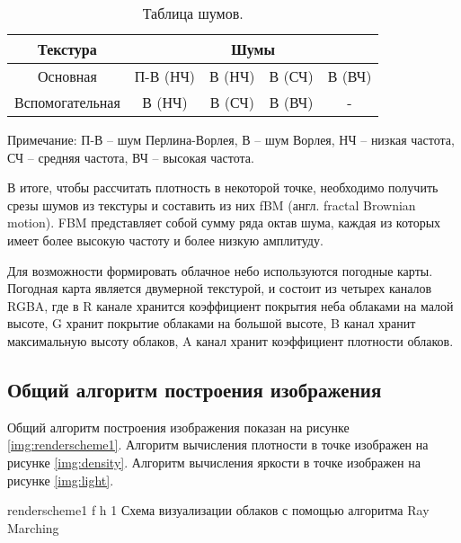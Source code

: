 \begin{table}[h]
	\centering
	\begin{threeparttable}
		\captionsetup{justification=raggedleft,singlelinecheck=false}
		\caption{Таблица шумов.}      
		\begin{tabular}{|c|c|c|c|c|}
			\hline
			Текстура & \multicolumn{4}{c|}{Шумы} \\
			\hline
			Основная & П-В (НЧ) & В (НЧ) & В (СЧ) & В (ВЧ)\\
			\hline
			Вспомогательная & В (НЧ) & В (СЧ) & В (ВЧ) & -\\
			\hline
		\end{tabular}
		\begin{tablenotes}
			\small
			\item Примечание: П-В -- шум Перлина-Ворлея, В -- шум Ворлея, НЧ -- низкая частота, СЧ -- средняя частота, ВЧ -- высокая частота.
		\end{tablenotes}
		\label{tab:textures}
	\end{threeparttable} 
	
	
\end{table}

В итоге, чтобы рассчитать плотность в некоторой точке, необходимо получить срезы шумов из текстуры и составить из них fBM (англ. fractal Brownian motion). FBM представляет собой сумму ряда октав шума, каждая из которых имеет более высокую частоту и более низкую амплитуду.


Для возможности формировать облачное небо используются погодные карты. Погодная карта является двумерной текстурой, и состоит из четырех каналов RGBA, где в R канале хранится коэффициент покрытия неба облаками на малой высоте, G хранит покрытие облаками на большой высоте, B канал хранит максимальную высоту облаков, A канал хранит коэффициент плотности облаков. 

\subsection{Общий алгоритм построения изображения}

Общий алгоритм построения изображения показан на рисунке \ref{img:renderscheme1}. Алгоритм вычисления плотности в точке изображен на рисунке \ref{img:density}. Алгоритм вычисления яркости в точке изображен на рисунке \ref{img:light}.
\clearpage

{renderscheme1} %
{f} %
{h} %
{1\textwidth} %
{Схема визуализации облаков с помощью алгоритма Ray Marching} %



